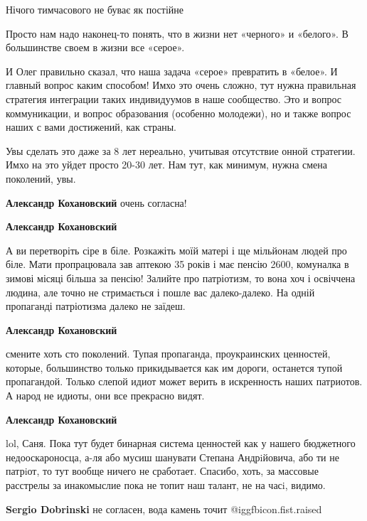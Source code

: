 \begin{itemize}
\begin{itemize}
Нічого тимчасового не буває як постійне

\end{itemize} %


Просто нам надо наконец-то понять, что в жизни нет «черного» и «белого». В
большинстве своем в жизни все «серое».

И Олег правильно сказал, что наша задача «серое» превратить в «белое». И
главный вопрос каким способом! Имхо это очень сложно, тут нужна правильная
стратегия интеграции таких индивидуумов в наше сообщество. Это и вопрос
коммуникации, и вопрос образования (особенно молодежи), но и также вопрос наших
с вами достижений, как страны.

Увы сделать это даже за 8 лет нереально, учитывая отсутствие онной стратегии.
Имхо на это уйдет просто 20-30 лет. Нам тут, как минимум, нужна смена
поколений, увы.

\begin{itemize} %
\textbf{Александр Кохановский} очень согласна!

\textbf{Александр Кохановский} 

А ви перетворіть сіре в біле. Розкажіть моїй матері і ще мільйонам людей про
біле. Мати пропрацювала зав аптекою 35 років і має пенсію 2600, комуналка в
зимові місяці більша за пенсію! Залийте про патріотизм, то вона хоч і освіччена
людина, але точно не стримається і пошле вас далеко-далеко. На одній пропаганді
патріотизма далеко не заїдеш.


\textbf{Александр Кохановский} 

смените хоть сто поколений. Тупая пропаганда, проукраинских ценностей, которые,
большинство только прикидывается как им дороги, останется тупой пропагандой.
Только слепой идиот может верить в искренность наших патриотов. А народ не
идиоты, они все прекрасно видят.

\textbf{Александр Кохановский} 

lol, Саня. Пока тут будет бинарная система ценностей как у нашего бюджетного
недооскароносца, а-ля або мусиш шанувати Степана Андрiйовича, або ти не
патрiот, то тут вообще ничего не сработает. Спасибо, хоть, за массовые
расстрелы за инакомыслие пока не топит наш талант, не на часi, видимо.


\textbf{Sergio Dobrinski} не согласен, вода камень точит @igg{fbicon.fist.raised}


\end{itemize}
\end{itemize}

